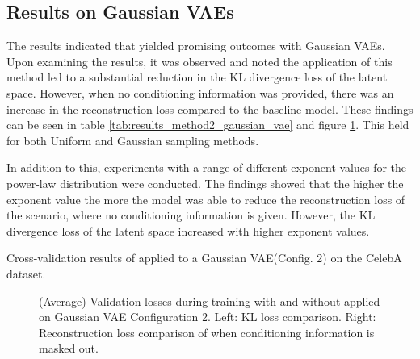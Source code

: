 
\subsection{Results on Gaussian VAEs}

The results indicated that  yielded promising outcomes with Gaussian VAEs. Upon examining the results, it was observed and noted the application of this method led to a substantial reduction in the KL divergence loss of the latent space. However, when no conditioning information was provided, there was an increase in the reconstruction loss compared to the baseline model. These findings can be seen in table \ref{tab:results_method2_gaussian_vae} and figure \ref{fig:results_method2_gaussian_vae}. This held for both Uniform and Gaussian sampling methods.

In addition to this, experiments with a range of different exponent values for the power-law distribution were conducted. The findings showed that the higher the exponent value the more the model was able to reduce the reconstruction loss of the scenario, where no conditioning information is given. However, the KL divergence loss of the latent space increased with higher exponent values.


\begin{table}[H]
    \centering
    
    \caption{Cross-validation results of  applied to a Gaussian VAE(Config. 2) on the CelebA dataset.}
    \label{tab:results_method2_gaussian_vae}
\end{table}

\begin{figure}[H]
    \centering
    \scalebox{0.48}{}
    \scalebox{0.48}{}
    \caption[Validation loss during training with  applied on Gaussian VAE.]
    {
        (Average) Validation losses during training with and without  applied on Gaussian VAE Configuration 2.
        Left: KL loss comparison. Right: Reconstruction loss comparison of when conditioning information is masked out.
    }
    \label{fig:results_method2_gaussian_vae}
\end{figure}

